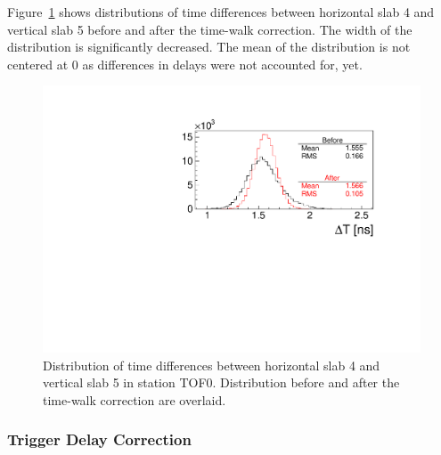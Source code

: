 Figure~\ref{fig:SlabDTTW} shows distributions of time differences
between horizontal slab 4 and vertical slab 5 before and after the
time-walk correction. The width of the distribution is significantly
decreased. The mean of the distribution is not centered at 0 as
differences in delays \Tzero{} were not accounted for, yet.

\begin{figure}
  \begin{center}
  \includegraphics[width=0.5\columnwidth]{02_slab_dt_resolution_tw_effect}
  \caption{Distribution of time differences \DT{} between horizontal slab 4 and
    vertical slab 5 in station TOF0. Distribution before and after the
  time-walk correction are overlaid.}
  \label{fig:SlabDTTW}
  \end{center}
\end{figure}


\subsubsection{Trigger Delay Correction}

\newcommand{\Tdelay}[2]{\ensuremath{T_{\text{tr}}^{#1,#2}}}
\newcommand{\TW}{\ensuremath{\text{TW}}}
\newcommand{\PMT}{\ensuremath{\text{PMT}}}
\newcommand{\ttrig}[2]{\ensuremath{{t}_{#2}^{#1}}}
\newcommand{\mean}[1]{\ensuremath{\left< #1 \right>}}


